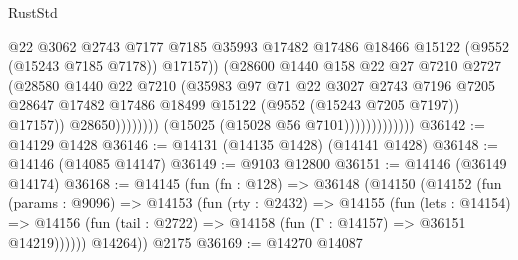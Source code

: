 \begin{lexlean}{RustStd}
\begin{coremodule}
                                            @22
                                            @3062
                                            @2743
                                            @7177
                                            @7185
                                            @35993
                                            @17482
                                            @17486
                                            @18466
                                            @15122
                                            (@9552 (@15243 @7185 @7178))
                                            @17157))
                                        (@28600
                                          @1440
                                          @158
                                          @22
                                          @27
                                          @7210
                                          @2727
                                          (@28580
                                            @1440
                                            @22
                                            @7210
                                            (@35983
                                              @97
                                              @71
                                              @22
                                              @3027
                                              @2743
                                              @7196
                                              @7205
                                              @28647
                                              @17482
                                              @17486
                                              @18499
                                              @15122
                                              (@9552 (@15243 @7205 @7197))
                                              @17157))
                                          @28650))))))))
                          (@15025 (@15028 @56 @7101)))))))))))))
@36142 := @14129 @1428
@36146 := @14131 (@14135 @1428) (@14141 @1428)
@36148 := @14146 (@14085 @14147)
@36149 := @9103 @12800
@36151 := @14146 (@36149 @14174)
@36168 := @14145
    (fun (fn : @128) =>
    @36148
      (@14150
        (@14152
          (fun (params : @9096) =>
          @14153
            (fun (rty : @2432) =>
            @14155
              (fun (lets : @14154) =>
              @14156 (fun (tail : @2722) => @14158 (fun (Γ : @14157) => @36151 @14219))))))
        @14264))
    @2175
@36169 := @14270 @14087

\end{coremodule}
\end{lexlean}
